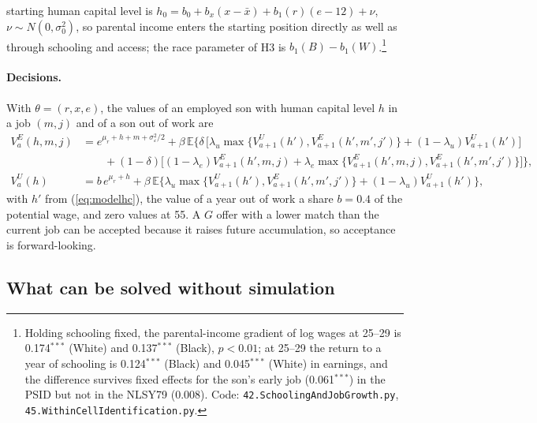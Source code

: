 starting human capital level is $h_0 = b_0 + b_x (x - \bar x) + b_1(r) (e - 12) + \nu$, $\nu \sim N(0, \sigma_0^2)$,
so parental income enters the starting position directly as well as through schooling and access; the race parameter
of H3 is $b_1(B) - b_1(W)$.\footnote{Holding schooling fixed, the parental-income gradient of log wages at 25--29 is
0.174$^{***}$ (White) and 0.137$^{***}$ (Black), $p < 0.01$; at 25--29 the return to a year of schooling is 0.124$^{***}$
(Black) and 0.045$^{***}$ (White) in earnings, and the difference survives fixed effects for the son's early job
(0.061$^{***}$) in the PSID but not in the NLSY79 (0.008). Code: \texttt{42.SchoolingAndJobGrowth.py},
\texttt{45.WithinCellIdentification.py}.}

\paragraph{Decisions.} With $\theta = (r, x, e)$, the values of an employed son with human capital level $h$ in a job
$(m, j)$ and of a son out of work are
\begin{align}
V^E_a(h, m, j) &= e^{\mu_r + h + m + \sigma_\varepsilon^2/2} + \beta\, \mathbb{E}\Big\{\delta\, \big[\lambda_u
\max\{V^U_{a+1}(h'), V^E_{a+1}(h', m', j')\} + (1 - \lambda_u) V^U_{a+1}(h')\big] \nonumber\\
&\qquad + (1 - \delta) \big[(1 - \lambda_e) V^E_{a+1}(h', m, j) + \lambda_e \max\{V^E_{a+1}(h', m, j),
V^E_{a+1}(h', m', j')\}\big]\Big\}, \nonumber\\
V^U_a(h) &= b\, e^{\mu_r + h} + \beta\, \mathbb{E}\Big\{\lambda_u \max\{V^U_{a+1}(h'), V^E_{a+1}(h', m', j')\}
+ (1 - \lambda_u) V^U_{a+1}(h')\Big\},
\end{align}
with $h'$ from (\ref{eq:modelhc}), the value of a year out of work a share $b = 0.4$ of the potential wage, and zero
values at 55. A $G$ offer with a lower match than the current job can be accepted because it raises future
accumulation, so acceptance is forward-looking.

\subsection{What can be solved without simulation}


